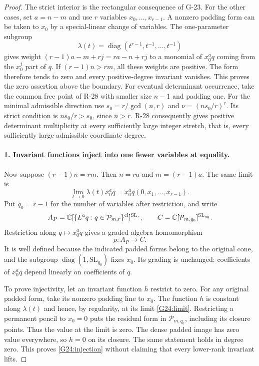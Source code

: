 \begin{proof}
The strict interior is the rectangular consequence of G-23.
For the other cases, set $a=n-m$ and use $r$ variables
$x_0,\ldots,x_{r-1}$. A nonzero padding form can be taken
to $x_0$ by a special-linear change of variables. The
one-parameter subgroup
\[
 \lambda(t)=\operatorname{diag}(t^{r-1},t^{-1},\ldots,t^{-1})
\]
gives weight $(r-1)a-m+rj=ra-n+rj$ to a monomial of
$x_0^a q$ coming from the $x_0^j$ part of $q$.
If $(r-1)n>rm$, all these weights are positive. The form
therefore tends to zero and every positive-degree invariant
vanishes. This proves the zero assertion above the boundary.
For eventual determinant occurrence, take the common free
point of R-28 with smaller size $n-1$ and padding one.
For the minimal admissible direction use
$s_0=r/\gcd(n,r)$ and $\nu=(ns_0/r)^r$.
Its strict condition is $ns_0/r>s_0$, since $n>r$.
R-28 consequently gives positive determinant multiplicity
at every sufficiently large integer stretch, that is, every
sufficiently large admissible coordinate degree.

\paragraph{1. Invariant functions inject into one fewer variables at equality.}
Now suppose $(r-1)n=rm$. Then $n=ra$ and $m=(r-1)a$.
The same limit is
\begin{equation}\label{G24:limit}
 \lim_{t\to0}\lambda(t)x_0^a q
                =x_0^a q(0,x_1,\ldots,x_{r-1}).
\end{equation}
Put $q_0=r-1$ for the number of variables after restriction,
and write
\[
 A_P=\mathbb C[\{L^a q:q\in\mathcal P_{m,r}\}^{\rm cl}]^{\mathrm{SL}_r},
 \qquad C=\mathbb C[\mathcal P_{m,q_0}]^{\mathrm{SL}_{q_0}}.
\]
Restriction along $q\mapsto x_0^a q$ gives a graded algebra
homomorphism
\begin{equation}\label{G24:injection}
 \rho:A_P\longrightarrow C.
\end{equation}
It is well defined because the indicated padded forms belong
to the original cone, and the subgroup
$\operatorname{diag}(1,\mathrm{SL}_{q_0})$ fixes $x_0$.
Its grading is unchanged: coefficients of $x_0^a q$ depend
linearly on coefficients of $q$.

To prove injectivity, let an invariant function $h$ restrict
to zero. For any original padded form, take its nonzero
padding line to $x_0$. The function $h$ is constant along
$\lambda(t)$ and hence, by regularity, at its limit
\eqref{G24:limit}. Restricting a permanent pencil to
$x_0=0$ puts the residual form in $\mathcal P_{m,q_0}$,
including its closure points. Thus the value at the limit
is zero. The dense padded image has zero value everywhere,
so $h=0$ on its closure. The same statement holds in degree
zero. This proves \eqref{G24:injection} without claiming
that every lower-rank invariant lifts.


\end{proof}
